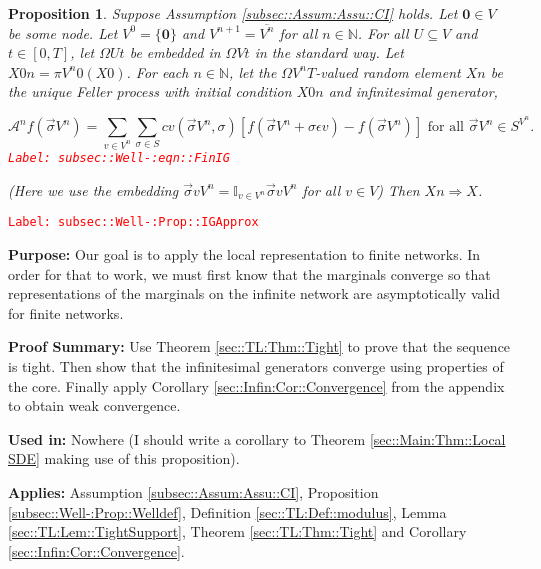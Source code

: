 \documentclass[12pt]{article}
\newcommand{\mb}{\mathbb}
\newcommand{\mc}{\mathcal}
\newcommand{\ov}{\overline}
\newcommand{\te}{\text}
\newcommand{\ep}{\epsilon}
\newcommand{\tr}{\textcolor{red}}
\newcommand{\labe}[1]{\tr{\texttt{Label: #1}}}
\newcommand{\purpose}{\textbf{Purpose: }}
\newcommand{\pfsum}{\textbf{Proof Summary: }}
\newcommand{\usein}{\textbf{Used in: }}
\newcommand{\app}{\textbf{Applies: }}
\renewcommand{\root}{\mathbf{0}}				%
\renewcommand{\v}{v}							%
\renewcommand{\U}{U}							%
\renewcommand{\S}{S}							%
\newcommand{\s}{\sigma}							%
\newcommand{\sv}{\vec{\s}}						%
\newcommand{\ev}{\ep}							%
\newcommand{\T}{T}								%
\renewcommand{\t}{t}							%
\newcommand{\proj}{\pi}							%
\newcommand{\X}{X}								%
\newcommand{\IG}{\mc{A}}						%
\newcommand{\IGr}{c}							%
\newcommand{\cl}{\ov}							%
\newcommand{\sln}[1]{^{#1}}						%
\newtheorem{prop}[thms]{Proposition}
\begin{document}
\begin{prop}
Suppose Assumption \ref{subsec::Assum:Assu::CI} holds. Let \(\root \in  V\) be some node. Let \( V\sln{0} = \{\root\}\) and \( V\sln{n+1} = \cl{ V\sln{n}}\) for all \(n \in \mb{N}\). For all \(\U \subseteq  V\) and \(\t \in [0,\T]\), let \(\Omega{\U}{\t}\) be embedded in \(\Omega{ V}{\t}\) in the standard way. Let \(\X{}{0}{n} = \proj{ V\sln{n}}{0}(\X{}{0})\). For each \(n\in\mb{N}\), let the \(\Omega{ V\sln{n}}{\T}\)-valued random element \(\X{}{}{n}\) be the unique Feller process with initial condition \(\X{}{0}{n}\) and infinitesimal generator,

\begin{equation}
\IG\sln{n}f(\sv{}{ V\sln{n}}) = \sum_{\v\in  V\sln{n}}\sum_{\s\in \S} \IGr{\v}(\sv{}{ V\sln{n}}, \s)[f(\sv{}{ V\sln{n}} + \s\ev{\v}) - f(\sv{}{ V\sln{n}})]\te{ for all } \sv{}{ V\sln{n}} \in \S^{ V\sln{n}}.
\label{subsec::Well-:eqn::FinIG}
\end{equation}
\labe{subsec::Well-:eqn::FinIG}

(Here we use the embedding \(\sv{\v}{ V\sln{n}} = \mb{I}_{\v\in V\sln{n}} \sv{\v}{ V\sln{n}}\) for all \(\v \in  V\)) Then \(\X{}{}{n} \Rightarrow \X{}{}\).
\label{subsec::Well-:Prop::IGApprox}
\end{prop}
\labe{subsec::Well-:Prop::IGApprox}

\purpose Our goal is to apply the local representation to finite networks. In order for that to work, we must first know that the marginals converge so that representations of the marginals on the infinite network are asymptotically valid for finite networks.

\pfsum Use Theorem \ref{sec::TL:Thm::Tight} to prove that the sequence is tight. Then show that the infinitesimal generators converge using properties of the core. Finally apply Corollary \ref{sec::Infin:Cor::Convergence} from the appendix to obtain weak convergence.

\usein Nowhere (I should write a corollary to Theorem \ref{sec::Main:Thm::Local SDE} making use of this proposition).

\app Assumption \ref{subsec::Assum:Assu::CI}, Proposition \ref{subsec::Well-:Prop::Welldef}, Definition \ref{sec::TL:Def::modulus}, Lemma \ref{sec::TL:Lem::TightSupport}, Theorem \ref{sec::TL:Thm::Tight} and Corollary \ref{sec::Infin:Cor::Convergence}.
\end{document}
